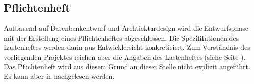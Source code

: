 \subsection{Pflichtenheft}
\label{sec:Pflichtenheft}

Aufbauend auf Datenbankentwurf und Archtiekturdesign wird die Entwurfsphase mit der Erstellung eines Pflichtenheftes abgeschlossen. Die Spezifikationen des Lastenheftes werden darin aus Entwicklersicht konkretisiert. Zum Verständnis des vorliegenden Projektes reichen aber die Angaben des Lastenheftes (siehe Seite \pageref{sec:Lastenheft}). Das Pflichtenheft wird aus diesem Grund an dieser Stelle nicht explizit angeführt. Es kann aber in \citet{pflichtenheft2013} nachgelesen werden.